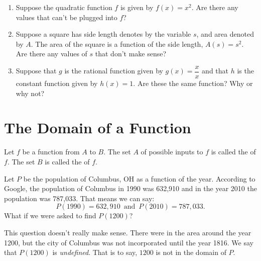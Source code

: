 \documentclass[nooutcomes]{ximera}
\begin{document}
	\begin{exploration}
		\begin{enumerate}[label=\alph*.]
			\item Suppose the quadratic function $f$ is given by $f(x) = x^2$. Are there any values that can't be plugged into $f$?
			\item Suppose a square has side length denotes by the variable $s$, and area denoted by $A$. The area of the square is a function of the
					side length, $A(s) = s^2$. Are there any values of $s$ that don't make sense?
			\item Suppose that $g$ is the rational function given by $g(x) = \dfrac{x}{x}$ and that $h$ is the constant function given by $h(x) = 1$. 
					Are these the same function? Why or why not?
		\end{enumerate}
	\end{exploration}


\section{The Domain of a Function}
		
	\begin{definition}
		Let $f$ be a function from $A$ to $B$. The set $A$ of possible inputs to $f$ is called the  of $f$. The set $B$ is called the  of $f$.
	\end{definition}

	\begin{example}
		Let $P$ be the population of Columbus, OH as a function of the year. According to Google, the population of Columbus in 1990 was 632,910 and in the year 2010 the population was 787,033. That means we can say: 
			$$ P(1990) = 632,910 \,\text{ and } \,P(2010) =  787,033. $$
		What if we were asked to find $P(1200)$?
		
		\begin{explanation}
			This question doesn't really make sense. There were  
			in the area around the year 1200, but the city of Columbus was not incorporated until the year 1816. We say that $P(1200)$ is \emph{undefined}. 
			That is to say, $1200$ is not in the domain of $P$.
		\end{explanation}
	\end{example}
\end{document}
